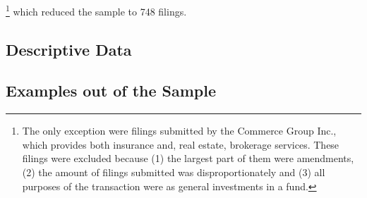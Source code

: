 \documentclass[12pt]{article}
\begin{document}
\footnote{The only exception were filings submitted by the Commerce Group Inc., which provides both insurance and, real estate, brokerage services. These filings were excluded because (1) the largest part of them were amendments, (2) the amount of filings submitted was disproportionately and (3) all purposes of the transaction were as general investments in a fund.}
which reduced the sample to 748 filings. 

\subsection{Descriptive Data}
\subsection{Examples out of the Sample}

\pagebreak
\end{document}
